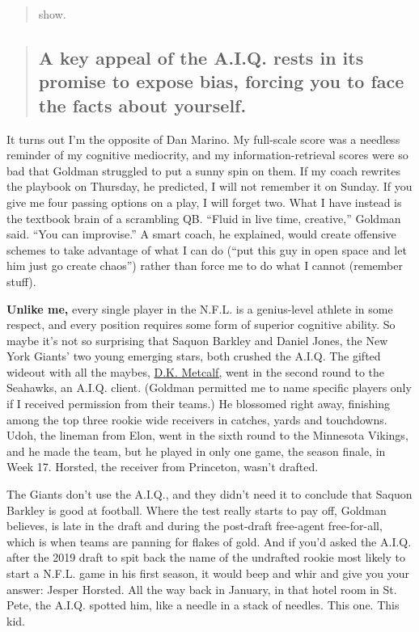 \begin{quote}
show.
\end{quote}

\begin{quote}
\hypertarget{a-key-appeal-of-the-aiq-rests-in-its-promise-to-expose-bias-forcing-you-to-face-the-facts-about-yourself}{%
\subsection{A key appeal of the A.I.Q. rests in its promise to expose
bias, forcing you to face the facts about
yourself.}\label{a-key-appeal-of-the-aiq-rests-in-its-promise-to-expose-bias-forcing-you-to-face-the-facts-about-yourself}}
\end{quote}

It turns out I'm the opposite of Dan Marino. My full-scale score was a
needless reminder of my cognitive mediocrity, and my
information-retrieval scores were so bad that Goldman struggled to put a
sunny spin on them. If my coach rewrites the playbook on Thursday, he
predicted, I will not remember it on Sunday. If you give me four passing
options on a play, I will forget two. What I have instead is the
textbook brain of a scrambling QB. ``Fluid in live time, creative,''
Goldman said. ``You can improvise.'' A smart coach, he explained, would
create offensive schemes to take advantage of what I can do (``put this
guy in open space and let him just go create chaos'') rather than force
me to do what I cannot (remember stuff).

\textbf{Unlike me,} every single player in the N.F.L. is a genius-level
athlete in some respect, and every position requires some form of
superior cognitive ability. So maybe it's not so surprising that Saquon
Barkley and Daniel Jones, the New York Giants' two young emerging stars,
both crushed the A.I.Q. The gifted wideout with all the maybes,
\href{https://www.seahawks.com/video/seahawks-wide-receiver-d-k-metcalf-college-highlights}{D.K.
Metcalf,} went in the second round to the Seahawks, an A.I.Q. client.
(Goldman permitted me to name specific players only if I received
permission from their teams.) He blossomed right away, finishing among
the top three rookie wide receivers in catches, yards and touchdowns.
Udoh, the lineman from Elon, went in the sixth round to the Minnesota
Vikings, and he made the team, but he played in only one game, the
season finale, in Week 17. Horsted, the receiver from Princeton, wasn't
drafted.

The Giants don't use the A.I.Q., and they didn't need it to conclude
that Saquon Barkley is good at football. Where the test really starts to
pay off, Goldman believes, is late in the draft and during the
post-draft free-agent free-for-all, which is when teams are panning for
flakes of gold. And if you'd asked the A.I.Q. after the 2019 draft to
spit back the name of the undrafted rookie most likely to start a N.F.L.
game in his first season, it would beep and whir and give you your
answer: Jesper Horsted. All the way back in January, in that hotel room
in St. Pete, the A.I.Q. spotted him, like a needle in a stack of
needles. This one. This kid.

